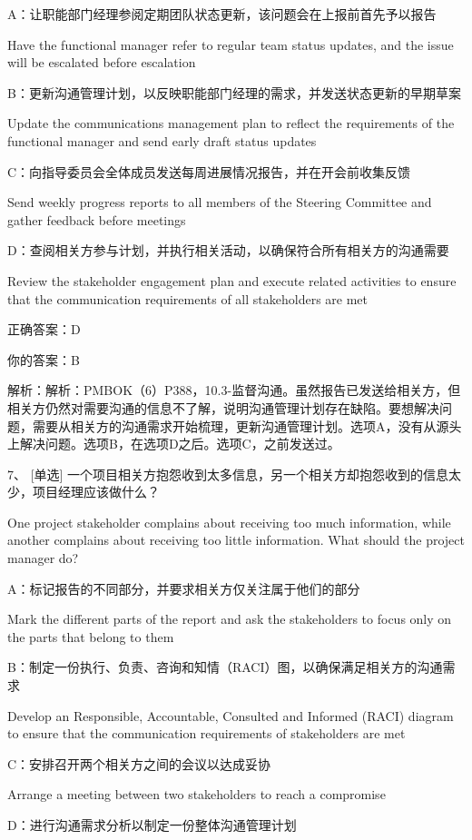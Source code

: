 A：让职能部门经理参阅定期团队状态更新，该问题会在上报前首先予以报告

Have the functional manager refer to regular team status updates, and the issue will be escalated before escalation

B：更新沟通管理计划，以反映职能部门经理的需求，并发送状态更新的早期草案

Update the communications management plan to reflect the requirements of the functional manager and send early draft status updates

C：向指导委员会全体成员发送每周进展情况报告，并在开会前收集反馈

Send weekly progress reports to all members of the Steering Committee and gather feedback before meetings

D：查阅相关方参与计划，并执行相关活动，以确保符合所有相关方的沟通需要

Review the stakeholder engagement plan and execute related activities to ensure that the communication requirements of all stakeholders are met

正确答案：D

你的答案：B

解析：解析：PMBOK（6）P388，10.3-监督沟通。虽然报告已发送给相关方，但相关方仍然对需要沟通的信息不了解，说明沟通管理计划存在缺陷。要想解决问题，需要从相关方的沟通需求开始梳理，更新沟通管理计划。选项A，没有从源头上解决问题。选项B，在选项D之后。选项C，之前发送过。


7、 [单选] 一个项目相关方抱怨收到太多信息，另一个相关方却抱怨收到的信息太少，项目经理应该做什么？

One project stakeholder complains about receiving too much information, while another complains about receiving too little information. What should the project manager do?

A：标记报告的不同部分，并要求相关方仅关注属于他们的部分

Mark the different parts of the report and ask the stakeholders to focus only on the parts that belong to them

B：制定一份执行、负责、咨询和知情（RACI）图，以确保满足相关方的沟通需求

Develop an Responsible, Accountable, Consulted and Informed (RACI) diagram to ensure that the communication requirements of stakeholders are met

C：安排召开两个相关方之间的会议以达成妥协

Arrange a meeting between two stakeholders to reach a compromise

D：进行沟通需求分析以制定一份整体沟通管理计划


